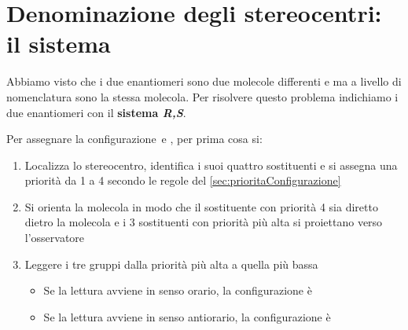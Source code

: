 \section{Denominazione degli stereocentri: il sistema }
Abbiamo visto che i due enantiomeri sono due molecole differenti e ma a livello di nomenclatura sono la stessa molecola. Per risolvere questo problema indichiamo i due enantiomeri con il \textbf{sistema \textit{R,S}}.

\noindent Per assegnare la configurazione \rectus\,e \sinister, per prima cosa si:
\begin{enumerate}
	\item Localizza lo stereocentro, identifica i suoi quattro sostituenti e si assegna una priorità da 1 a 4 secondo le regole del \autoref{sec:prioritaConfigurazione}
	\item Si orienta la molecola in modo che il sostituente con priorità 4 sia diretto dietro la molecola e i 3 sostituenti con priorità più alta si proiettano verso l'osservatore
	\item Leggere i tre gruppi dalla priorità più alta a quella più bassa
	      \begin{itemize}
		      \item Se la lettura avviene in senso orario, la configurazione è \rectus
		      \item Se la lettura avviene in senso antiorario, la configurazione è \sinister
	      \end{itemize}
\end{enumerate}

